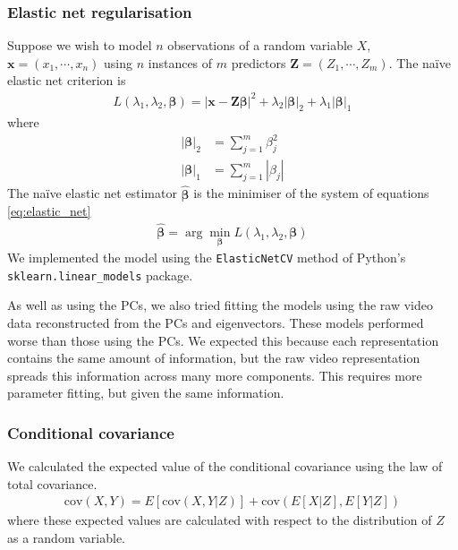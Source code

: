 \documentclass[a4paper,12pt]{article}
\theoremstyle{definition}
\newcommand{\cov}{\text{cov}} %
\begin{document}
        \subsubsection{Elastic net regularisation}
        Suppose we wish to model $n$ observations of a random variable $X$, $\mathbf{x} = (x_1, \cdots, x_n)$ using $n$ instances of $m$ predictors $\mathbf{Z} = (Z_1, \cdots, Z_m)$. The na\"{i}ve elastic net criterion is
        \begin{align}\label{eq:elastic_net}
            L(\lambda_1, \lambda_2, \boldsymbol{\beta}) = | \mathbf{x} - \mathbf{Z} \boldsymbol{\beta} |^2 + \lambda_2 |\boldsymbol{\beta}|_2 + \lambda_1 |\boldsymbol{\beta}|_1
        \end{align}
        where
        \begin{align}
          |\boldsymbol{\beta}|_2 &= \sum_{j=1}^m \beta_j^2 \\
          |\boldsymbol{\beta}|_1 &= \sum_{j=1}^m |\beta_j|
        \end{align}
        The na\"{i}ve elastic net estimator $\hat{\boldsymbol{\beta}}$ is the minimiser of the system of equations \ref{eq:elastic_net} \cite{zou}
        \begin{align}
          \hat{\boldsymbol{\beta}} = \arg \min_{\boldsymbol{\beta}} L(\lambda_1, \lambda_2, \boldsymbol{\beta})
        \end{align}
        We implemented the model using the \texttt{ElasticNetCV} method of Python's \\ \texttt{sklearn.linear\_models} package.

        As well as using the PCs, we also tried fitting the models using the raw video data reconstructed from the PCs and eigenvectors. These models performed worse than those using the PCs. We expected this because each representation contains the same amount of information, but the raw video representation spreads this information across many more components. This requires more parameter fitting, but given the same information.

        \subsubsection{Conditional covariance}
        We calculated the expected value of the conditional covariance using the law of total covariance.
        \begin{align}\label{eq:law_of_total_covariance}
            \cov (X,Y) = E[ \cov(X,Y|Z)] + \cov(E[X|Z], E[Y|Z])
        \end{align}
        where these expected values are calculated with respect to the distribution of $Z$ as a random variable.
\end{document}
